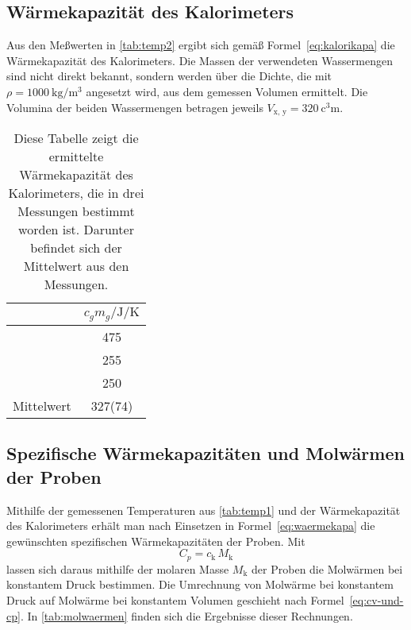 \subsection{Wärmekapazität des Kalorimeters}

Aus den Meßwerten in \cref{tab:temp2} ergibt sich gemäß
Formel~\eqref{eq:kalorikapa} die Wärmekapazität des Kalorimeters.  Die
Massen der verwendeten Wassermengen sind nicht direkt bekannt, sondern
werden über die Dichte, die mit $\rho = \SI{1000}{\kg\per\cubic\metre}$
angesetzt wird, aus dem gemessen Volumen ermittelt.  Die Volumina der
beiden Wassermengen betragen jeweils $V_\text{x, y} =
\SI{320}{\cubic\centi\metre}$.

\begin{table}
  \centering
  \begin{tabular}{lS}
    \toprule
    & $c_g m_g/\si{\J\per\kelvin}$\\
    \midrule
    & 475 \\
    & 255 \\
    & 250 \\
    \midrule
    Mittelwert & 327(74) \\
    \bottomrule
  \end{tabular}

  \caption{Diese Tabelle zeigt die ermittelte Wärmekapazität des
    Kalorimeters, die in  drei Messungen bestimmt worden ist.  Darunter
    befindet sich der Mittelwert aus den Messungen.}
  \label{tab:waermekapkalori}
\end{table}

\subsection{Spezifische Wärmekapazitäten und Molwärmen der Proben}
\label{sec:molwaerme}

Mithilfe der gemessenen Temperaturen aus \cref{tab:temp1} und der
Wärmekapazität des Kalorimeters erhält man nach Einsetzen in
Formel~\eqref{eq:waermekapa} die gewünschten spezifischen
Wärmekapazitäten der Proben.  Mit
\begin{equation}
  C_p = c_\text{k} \, M_\text{k}
\end{equation}
lassen sich daraus mithilfe der molaren Masse $M_\text{k}$ der Proben
die Molwärmen bei konstantem Druck bestimmen.  Die Umrechnung von
Molwärme bei konstantem Druck auf Molwärme bei konstantem Volumen
geschieht nach Formel~\eqref{eq:cv-und-cp}.  In \cref{tab:molwaermen}
finden sich die Ergebnisse dieser Rechnungen.  

